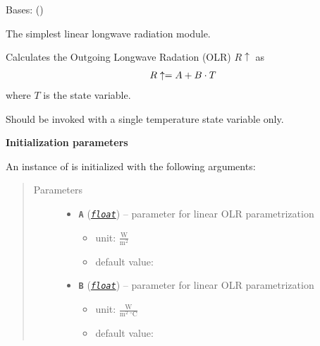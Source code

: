 \documentclass[a4paper,10pt,english]{sphinxmanual}
\begin{document}
\begin{fulllineitems}
\label{api/climlab.radiation:climlab.radiation.AplusBT.AplusBT}
Bases: {\hyperref[api/climlab.process:climlab.process.energy_budget.EnergyBudget]{\emph{}}} ()

The simplest linear longwave radiation module.

Calculates the Outgoing Longwave Radation (OLR) \(R\uparrow\) as
\begin{gather}
\begin{split}R\uparrow = A + B \cdot T\end{split}\notag
\end{gather}
where \(T\) is the state variable.

Should be invoked with a single temperature state variable only.

\textbf{Initialization parameters}

An instance of  is initialized with the following 
arguments:
\begin{quote}\begin{description}
\item[{Parameters}] \leavevmode\begin{itemize}
\item {} 
\textbf{\texttt{A}} (\href{http://docs.python.org/2.7/library/functions.html\#float}{\emph{\texttt{float}}}) -- 
parameter for linear OLR parametrization
\begin{itemize}
\item {} 
unit: \(\frac{\textrm{W}}
{\textrm{m}^2}\)

\item {} 
default value: 

\end{itemize}


\item {} 
\textbf{\texttt{B}} (\href{http://docs.python.org/2.7/library/functions.html\#float}{\emph{\texttt{float}}}) -- 
parameter for linear OLR parametrization
\begin{itemize}
\item {} 
unit: \(\frac{\textrm{W}}
{\textrm{m}^2 \ ^{\circ} \textrm{C}}\)

\item {} 
default value: 


\end{itemize}
\end{itemize}
\end{description}
\end{quote}
\end{fulllineitems}
\end{document}

